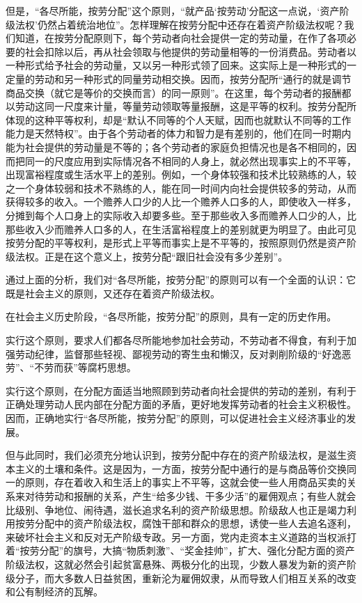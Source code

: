 \documentclass{book}
\begin{document}
但是，“各尽所能，按劳分配”这个原则，“就产品‘按劳动’分配这一点说，‘资产阶级法权’仍然占着统治地位”。怎样理解在按劳分配中还存在着资产阶级法权呢？我们知道，在按劳分配原则下，每个劳动者向社会提供一定的劳动量，在作了各项必要的社会扣除以后，再从社会领取与他提供的劳动量相等的一份消费品。劳动者以一种形式给予社会的劳动量，又以另一种形式领了回来。这实际上是一种形式的一定量的劳动和另一种形式的同量劳动相交换。因而，按劳分配所“通行的就是调节商品交换（就它是等价的交换而言）的同一原则”。在这里，每个劳动者的报酬都以劳动这同一尺度来计量，等量劳动领取等量报酬，这是平等的权利。按劳分配所体现的这种平等权利，却是“默认不同等的个人天赋，因而也就默认不同等的工作能力是天然特权”。由于各个劳动者的体力和智力是有差别的，他们在同一时期内能为社会提供的劳动量是不等的；各个劳动者的家庭负担情况也是各不相同的，因而把同一的尺度应用到实际情况各不相同的人身上，就必然出现事实上的不平等，出现富裕程度或生活水平上的差别。例如，一个身体较强和技术比较熟练的人，较之一个身体较弱和技术不熟练的人，能在同一时间内向社会提供较多的劳动，从而获得较多的收入。一个赡养人口少的人比一个赡养人口多的人，即使收入一样多，分摊到每个人口身上的实际收入却要多些。至于那些收入多而赡养人口少的人，比那些收入少而赡养人口多的人，在生活富裕程度上的差别就更为明显了。由此可见按劳分配的平等权利，是形式上平等而事实上是不平等的，按照原则仍然是资产阶级法权。正是在这个意义上，按劳分配“跟旧社会没有多少差别”。

通过上面的分析，我们对“各尽所能，按劳分配”的原则可以有一个全面的认识：它既是社会主义的原则，又还存在着资产阶级法权。

在社会主义历史阶段，“各尽所能，按劳分配”的原则，具有一定的历史作用。

实行这个原则，要求人们都各尽所能地参加社会劳动，不劳动者不得食，有利于加强劳动纪律，监督那些轻视、鄙视劳动的寄生虫和懒汉，反对剥削阶级的“好逸恶劳”、“不劳而获”等腐朽思想。

实行这个原则，在分配方面适当地照顾到劳动者向社会提供的劳动的差别，有利于正确处理劳动人民内部在分配方面的矛盾，更好地发挥劳动者的社会主义积极性。因而，正确地实行“各尽所能，按劳分配”的原则，可以促进社会主义经济事业的发展。

但与此同时，我们必须充分地认识到，按劳分配中存在的资产阶级法权，是滋生资本主义的土壤和条件。这是因为，一方面，按劳分配中通行的是与商品等价交换同一的原则，存在着收入和生活上的事实上不平等，这就会使一些人用商品买卖的关系来对待劳动和报酬的关系，产生“给多少钱、干多少活”的雇佣观点；有些人就会比级别、争地位、闹待遇，滋长追求名利的资产阶级思想。阶级敌人也正是竭力利用按劳分配中的资产阶级法权，腐蚀干部和群众的思想，诱使一些人去追名逐利，来破坏社会主义和反对无产阶级专政。另一方面，党内走资本主义道路的当权派打着“按劳分配”的旗号，大搞“物质刺激”、“奖金挂帅”，扩大、强化分配方面的资产阶级法权，这就必然会引起贫富悬殊、两极分化的出现，少数人暴发为新的资产阶级分子，而大多数人日益贫困，重新沦为雇佣奴隶，从而导致人们相互关系的改变和公有制经济的瓦解。
\end{document}
